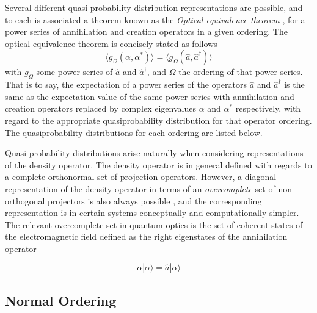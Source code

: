 \documentclass[reqno]{amsart}
\newcommand{\cre}{\hat{a}^\dagger}
\newcommand{\ann}{\hat{a}}
\begin{document}
Several different quasi-probability distribution representations are possible\autocite{Walls2008}, and to each is associated a theorem known as the \emph{Optical equivalence theorem} \autocite{Sudarshan1963}, for a power series of annihilation and creation operators in a given ordering. The optical equivalence theorem is concisely stated as follows
\begin{equation}
	\langle g_{\Omega} (\alpha, \alpha^*) \rangle = \langle g_{\Omega} (\hat{a}, \cre) \rangle
\end{equation}
with $g_\Omega$ some power series of $\hat{a}$ and $\cre$, and $\Omega$ the ordering of that power series. That is to say, the expectation of a power series of the operators $\hat{a}$ and $\cre$ is the same as the expectation value of the same power series with annihilation and creation operators replaced by complex eigenvalues $\alpha$ and $\alpha^*$ respectively, with regard to the appropriate quasiprobability distribution for that operator ordering. The quasiprobability distributions for each ordering are listed below.

Quasi-probability distributions arise naturally when considering representations of the density operator. The density operator is in general defined with regards to a complete orthonormal set of projection operators. However, a diagonal representation of the density operator in terms of an \emph{overcomplete} set of non-orthogonal projectors is also always possible \autocite{Sudarshan1963}, and the corresponding representation is in certain systems conceptually and computationally simpler. The relevant overcomplete set in quantum optics is the set of coherent states of the electromagnetic field defined as the right eigenstates of the annihilation operator

\begin{equation}
\alpha | \alpha \rangle = \ann | \alpha \rangle
\end{equation}
\subsection{Normal Ordering}
\end{document}

